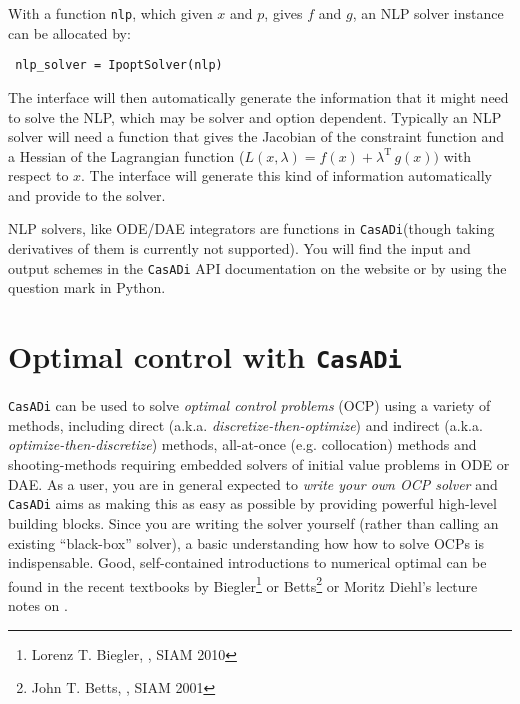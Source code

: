 \documentclass[a4paper,12pt]{book}
\newcommand{\CasADi}{\texttt{CasADi}\xspace}
\begin{document}
With a function \texttt{nlp}, which given $x$ and $p$, gives $f$ and $g$, an NLP solver instance can be allocated by:
\begin{verbatim}
 nlp_solver = IpoptSolver(nlp)
\end{verbatim}

The interface will then automatically generate the information that it might need to solve the NLP, which may be solver and option dependent. Typically an NLP solver will need a function that gives the Jacobian of the constraint function and a Hessian of the Lagrangian function ($L(x,\lambda) = f(x) + \lambda^{\text{T}} \, g(x))$ with respect to $x$. The interface will generate this kind of information automatically and provide to the solver.

NLP solvers, like ODE/DAE integrators are functions in \CasADi (though taking derivatives of them is currently not supported). You will find the input and output schemes in the \CasADi API documentation on the website or by using the question mark in Python.

\chapter{Optimal control with \CasADi}
\CasADi can be used to solve \emph{optimal control problems} (OCP) using a variety of methods, including direct (a.k.a. \emph{discretize-then-optimize}) and indirect (a.k.a. \emph{optimize-then-discretize}) methods, all-at-once (e.g. collocation) methods and shooting-methods requiring embedded solvers of initial value problems in ODE or DAE. As a user, you are in general expected to \emph{write your own OCP solver} and \CasADi aims as making this as easy as possible by providing powerful high-level building blocks. Since you are writing the solver yourself (rather than calling an existing ``black-box'' solver), a basic understanding how how to solve OCPs is indispensable. Good, self-contained introductions to numerical optimal can be found in the recent textbooks by Biegler\footnote{Lorenz T. Biegler, \emph{}, SIAM 2010} or Betts\footnote{John T. Betts, \emph{}, SIAM 2001} or Moritz Diehl's lecture notes on .
\end{document}
